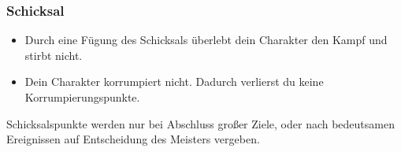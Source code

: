 \documentclass[a4paper,10pt,twoside,twocolumn,openany,nodeprecatedcode,bg=print]{dndbook}
\begin{document}
\subsubsection{Schicksal}
\begin{itemize}
  \item Durch eine Fügung des Schicksals überlebt dein Charakter den Kampf und stirbt nicht.
  \item Dein Charakter korrumpiert nicht. Dadurch verlierst du keine Korrumpierungspunkte.
\end{itemize}
Schicksalspunkte werden nur bei Abschluss großer Ziele, oder nach bedeutsamen Ereignissen auf Entscheidung des Meisters vergeben.


\end{document}

